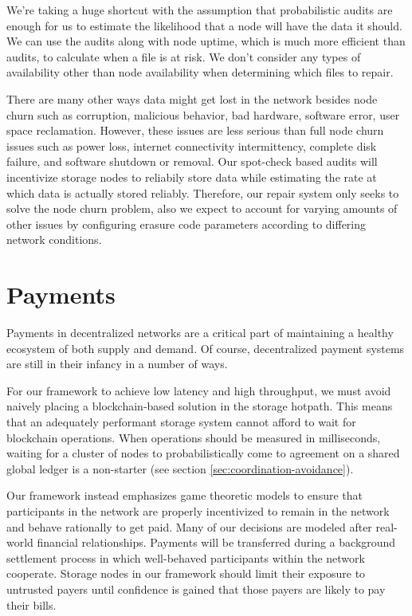\documentclass[11pt,fleqn,openany]{book}
\begin{document}
We're taking a huge shortcut with the assumption that
probabilistic audits are enough for us to estimate the likelihood that a node
will have the data it should. We can use the audits
along with node uptime, which is much more efficient than audits,
to calculate when a file is at risk.
We don't consider any types of availability other than node availability when
determining which files to repair.

There are many other ways data might get lost in the network besides node churn such as corruption, malicious behavior, bad hardware, software error, user space
reclamation. However, these issues are less serious than full node
churn issues such as power loss, internet connectivity intermittency, complete disk failure,
and software shutdown or removal.
Our spot-check based audits will incentivize storage nodes to reliabily store
data
while estimating the rate at which data is actually stored reliably.
Therefore, our repair system only seeks to solve the node churn problem, also
we expect to account for varying
amounts of other issues by configuring erasure code
parameters according to differing network conditions.

\section{Payments}

Payments in decentralized networks are a critical part of maintaining a healthy
ecosystem of both supply and demand. Of course, decentralized payment systems
are still in their infancy in a number of ways.

For our framework to achieve low latency and high throughput, we must
avoid naively placing a blockchain-based solution in the storage hotpath.
This means that an adequately performant storage system cannot afford to
wait for blockchain operations. When operations should be measured in
milliseconds, waiting for a cluster of nodes to probabilistically come to
agreement on a shared global ledger is a non-starter
(see section \ref{sec:coordination-avoidance}).

Our framework instead emphasizes game theoretic models to ensure
that participants in the network are properly incentivized to remain in the
network and behave rationally to get paid.
Many of our decisions are modeled after real-world financial relationships.
Payments will be transferred during
a background settlement process in which well-behaved participants within
the network cooperate. Storage nodes in our framework should limit their exposure
to untrusted payers until confidence is gained that those payers are likely
to pay their bills.
\end{document}
